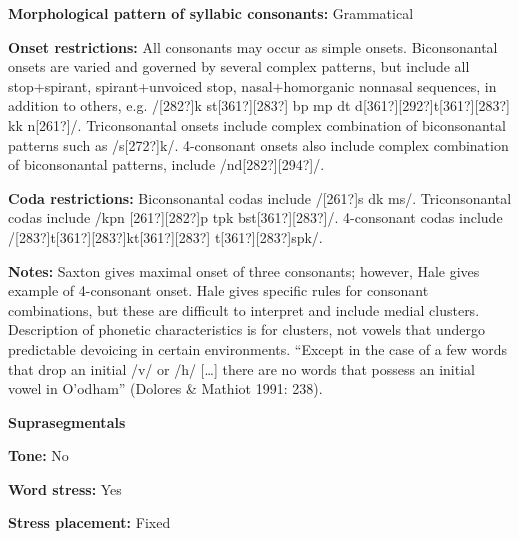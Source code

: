 \begin{styleBody}
\textbf{Morphological pattern of syllabic consonants:} Grammatical
\end{styleBody}

\begin{styleBody}
\textbf{Onset restrictions: }All consonants may occur as simple onsets. Biconsonantal onsets are varied and governed by several complex patterns, but include all stop+spirant, spirant+unvoiced stop, nasal+homorganic nonnasal sequences, in addition to others, e.g. /[282?]k st[361?][283?] bp mp dt d[361?][292?]t[361?][283?] kk n[261?]/. Triconsonantal onsets include complex combination of biconsonantal patterns such as /s[272?]k/. 4-consonant onsets also include complex combination of biconsonantal patterns, include /nd[282?][294?]/.
\end{styleBody}

\begin{styleBody}
\textbf{Coda restrictions: }Biconsonantal codas include /[261?]s dk ms/. Triconsonantal codas include /kpn [261?][282?]p tpk bst[361?][283?]/. 4-consonant codas include /[283?]t[361?][283?]kt[361?][283?] t[361?][283?]spk/.
\end{styleBody}

\begin{styleBody}
\textbf{Notes: }Saxton gives maximal onset of three consonants; however, Hale gives example of 4-consonant onset. Hale gives specific rules for consonant combinations, but these are difficult to interpret and include medial clusters. Description of phonetic characteristics is for clusters, not vowels that undergo predictable devoicing in certain environments. “Except in the case of a few words that drop an initial /v/ or /h/ […] there are no words that possess an initial vowel in O’odham” (Dolores \& Mathiot 1991: 238).
\end{styleBody}

\begin{styleBody}
\textbf{Suprasegmentals}
\end{styleBody}

\begin{styleBody}
\textbf{Tone:} No
\end{styleBody}

\begin{styleBody}
\textbf{Word stress:} Yes
\end{styleBody}

\begin{styleBody}
\textbf{Stress placement:} Fixed
\end{styleBody}

